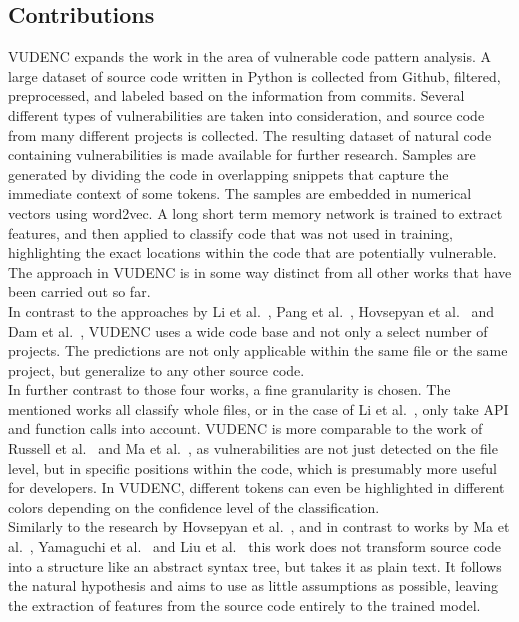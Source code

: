 \documentclass[
a4paper,
pagesize,
pdftex,
12pt,
twoside, %
BCOR=5mm, %
ngerman,
fleqn,
final,
]{scrartcl}
\begin{document}
	
	\subsection{Contributions}
	
	VUDENC expands the work in the area of vulnerable code pattern analysis. A large dataset of source code written in Python is collected from Github, filtered, preprocessed, and labeled based on the information from commits. Several different types of vulnerabilities are taken into consideration, and source code from many different projects is collected. The resulting dataset of natural code containing vulnerabilities is made available for further research. Samples are generated by dividing the code in overlapping snippets that capture the immediate context of some tokens. The samples are embedded in numerical vectors using word2vec. A long short term memory network is trained to extract features, and then applied to classify code that was not used in training, highlighting the exact locations within the code that are potentially vulnerable. The approach in VUDENC is in some way distinct from all other works that have been carried out so far.\\
	In contrast to the approaches by Li et al.~\cite{Li.2018}, Pang et al.~\cite{Pang.2015}, Hovsepyan et al.~\cite{Hovsepyan.2012} and Dam et al.~\cite{Dam.2017}, VUDENC uses a wide code base and not only a select number of projects. The predictions are not only applicable within the same file or the same project, but generalize to any other source code.\\
	In further contrast to those four works, a fine granularity is chosen. The mentioned works all classify whole files, or in the case of Li et al.~\cite{Li.2018}, only take API and function calls into account. VUDENC is more comparable to the work of Russell et al.~\cite{Russell.2018} and Ma et al.~\cite{Ma.2017}, as vulnerabilities are not just detected on the file level, but in specific positions within the code, which is presumably more useful for developers. In VUDENC, different tokens can even be highlighted in different colors depending on the confidence level of the classification.\\
	Similarly to the research by Hovsepyan et al.~\cite{Hovsepyan.2012}, and in contrast to works by Ma et al.~\cite{Ma.2017}, Yamaguchi et al.~\cite{Yamaguchi.2012} and Liu et al.~\cite{Liu.2018}
	this work does not transform source code into a structure like an abstract syntax tree, but takes it as plain text. It follows the natural hypothesis and aims to use as little assumptions as possible, leaving the extraction of features from the source code entirely to the trained model.\\
\end{document}
